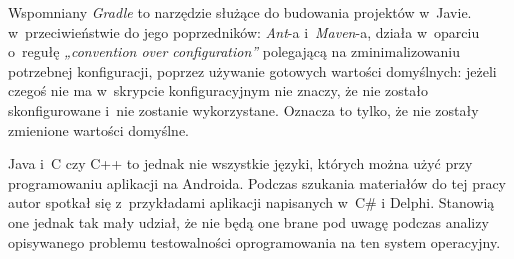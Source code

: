 Wspomniany \textit{Gradle} to narzędzie służące do budowania projektów w~Javie. w~przeciwieństwie do jego poprzedników: \textit{Ant}-a i~\textit{Maven}-a, działa w~oparciu o~regułę \textit{„convention over configuration”} polegającą na zminimalizowaniu potrzebnej konfiguracji, poprzez używanie gotowych wartości domyślnych: jeżeli czegoś nie ma w~skrypcie konfiguracyjnym nie znaczy, że nie zostało skonfigurowane i~nie zostanie wykorzystane. Oznacza to tylko, że nie zostały zmienione wartości domyślne.

Java i~C czy C++ to jednak nie wszystkie języki, których można użyć przy programowaniu aplikacji na Androida. Podczas szukania materiałów do tej pracy autor spotkał się z~przykładami aplikacji napisanych w~C\# i Delphi. Stanowią one jednak tak mały udział, że nie będą one brane pod uwagę podczas analizy opisywanego problemu testowalności oprogramowania na ten system operacyjny.





